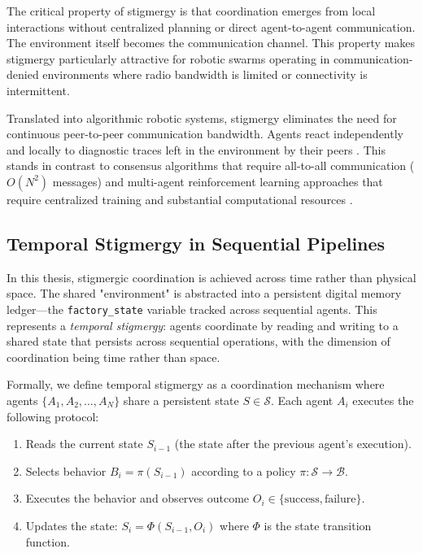 \documentclass[12pt,a4paper,oneside]{report}
\begin{document}
The critical property of stigmergy is that coordination emerges from local interactions without centralized planning or direct agent-to-agent communication. The environment itself becomes the communication channel. This property makes stigmergy particularly attractive for robotic swarms operating in communication-denied environments where radio bandwidth is limited or connectivity is intermittent.

Translated into algorithmic robotic systems, stigmergy eliminates the need for continuous peer-to-peer communication bandwidth. Agents react independently and locally to diagnostic traces left in the environment by their peers \cite{bongard2006resilient}. This stands in contrast to consensus algorithms that require all-to-all communication ($O(N^2)$ messages) and multi-agent reinforcement learning approaches that require centralized training and substantial computational resources \cite{domberg2026selfadapting, daneshmand2026slowrl}.

\subsection{Temporal Stigmergy in Sequential Pipelines}

In this thesis, stigmergic coordination is achieved across time rather than physical space. The shared "environment" is abstracted into a persistent digital memory ledger—the \texttt{factory\_state} variable tracked across sequential agents. This represents a \textit{temporal stigmergy}: agents coordinate by reading and writing to a shared state that persists across sequential operations, with the dimension of coordination being time rather than space.

Formally, we define temporal stigmergy as a coordination mechanism where agents $\{A_1, A_2, \ldots, A_N\}$ share a persistent state $S \in \mathcal{S}$. Each agent $A_i$ executes the following protocol:

\begin{enumerate}
    \item Reads the current state $S_{i-1}$ (the state after the previous agent's execution).
    \item Selects behavior $B_i = \pi(S_{i-1})$ according to a policy $\pi: \mathcal{S} \rightarrow \mathcal{B}$.
    \item Executes the behavior and observes outcome $O_i \in \{\text{success}, \text{failure}\}$.
    \item Updates the state: $S_i = \Phi(S_{i-1}, O_i)$ where $\Phi$ is the state transition function.
\end{enumerate}
\end{document}
